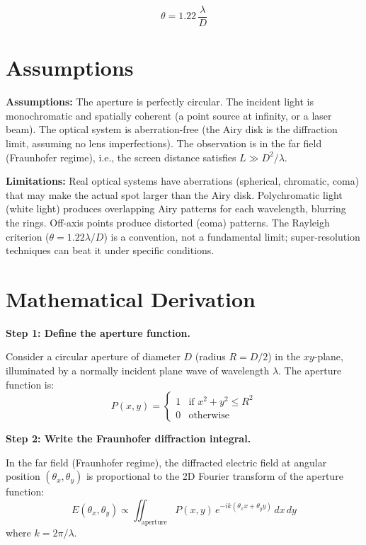 \documentclass[11pt,openright]{book}
\begin{document}
\begin{equation}
\theta = 1.22\,\frac{\lambda}{D}
\end{equation}
\section*{Assumptions}

\textbf{Assumptions:} The aperture is perfectly circular. The incident light is monochromatic and spatially coherent (a point source at infinity, or a laser beam). The optical system is aberration-free (the Airy disk is the diffraction limit, assuming no lens imperfections). The observation is in the far field (Fraunhofer regime), i.e., the screen distance satisfies $L \gg D^2/\lambda$.


\textbf{Limitations:} Real optical systems have aberrations (spherical, chromatic, coma) that may make the actual spot larger than the Airy disk. Polychromatic light (white light) produces overlapping Airy patterns for each wavelength, blurring the rings. Off-axis points produce distorted (coma) patterns. The Rayleigh criterion ($\theta = 1.22\lambda/D$) is a convention, not a fundamental limit; super-resolution techniques can beat it under specific conditions.


\section*{Mathematical Derivation}

\textbf{Step 1: Define the aperture function.}

Consider a circular aperture of diameter $D$ (radius $R = D/2$) in the $xy$-plane, illuminated by a normally incident plane wave of wavelength $\lambda$. The aperture function is:
\begin{equation}
P(x,y) = \begin{cases} 1 & \text{if } x^2 + y^2 \leq R^2 \\ 0 & \text{otherwise} \end{cases}
\end{equation}

\textbf{Step 2: Write the Fraunhofer diffraction integral.}

In the far field (Fraunhofer regime), the diffracted electric field at angular position $(\theta_x, \theta_y)$ is proportional to the 2D Fourier transform of the aperture function:
\begin{equation}
E(\theta_x, \theta_y) \propto \iint_{\text{aperture}} P(x,y)\,e^{-i k(\theta_x x + \theta_y y)}\,dx\,dy
\end{equation}
where $k = 2\pi/\lambda$.
\end{document}
